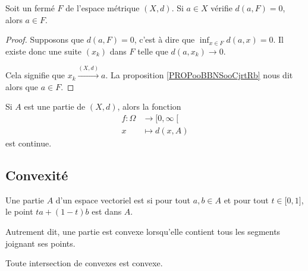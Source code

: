 \begin{lemma}        \label{LEMooEQIZooLpsbOe}
	Soit un fermé \( F\) de l'espace métrique \( (X,d)\). Si \( a\in X\) vérifie \( d(a,F)=0\), alors \( a\in F\).
\end{lemma}

\begin{proof}
	Supposons que \( d(a,F)=0\), c'est à dire que \( \inf_{x\in F} d(a,x) =0\). Il existe donc une suite \( (x_k)\) dans \( F\) telle que \( d(a,x_k)\to 0\).

	Cela signifie que \( x_k\stackrel{(X,d)}{\longrightarrow}a\). La proposition \ref{PROPooBBNSooCjrtRb} nous dit alors que \( a\in F\).
\end{proof}


\begin{lemma}        \label{LEMooCFGTooIfdcfk}
	Si \( A\) est une partie de \( (X,d)\), alors la fonction
	\begin{equation}
		\begin{aligned}
			f\colon \Omega & \to \mathopen[ 0 , \infty \mathclose[ \\
			x              & \mapsto d(x,A)
		\end{aligned}
	\end{equation}
	est continue.
\end{lemma}

\subsection{Convexité}

\begin{definition}        \label{DEFooQQEOooAFKbcQ}
	Une partie \( A\) d'un espace vectoriel est  si pour tout \( a,b\in A\) et pour tout \( t\in \mathopen[ 0 , 1 \mathclose]\), le point \( ta+(1-t)b\) est dans \( A\).

	Autrement dit, une partie est convexe lorsqu'elle contient tous les segments joignant ses points.
\end{definition}

\begin{proposition} \label{PROPooJOCEooUKhkqQ}
	Toute intersection de convexes est convexe.
\end{proposition}

